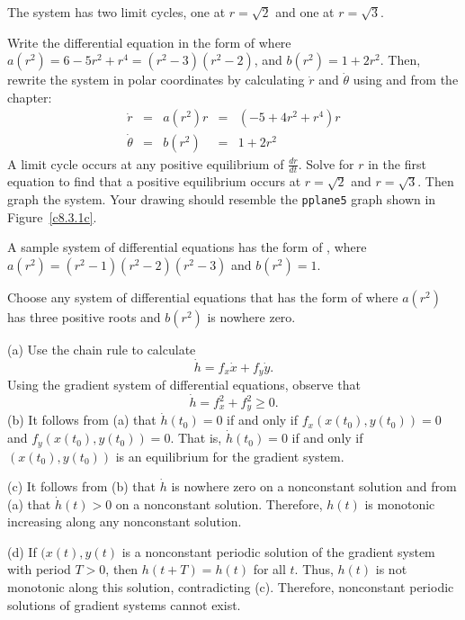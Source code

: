 \documentclass{ximera}
\begin{document}
\ans The system has two limit cycles, one at $r = \sqrt{2}$ and one
at $r = \sqrt{3}$. 

\soln Write the differential equation in the form of 
where $a(r^2) = 6 - 5r^2 + r^4=(r^2-3)(r^2-2)$, and 
$b(r^2) = 1+2r^2$.  Then,
rewrite the system in polar coordinates by calculating $\dot{r}$ and
$\dot{\theta}$ using  and  from the
chapter:
\[ 
\begin{array}{rcccl}
\dot{r} & = & a(r^2)r & = & (-5 + 4r^2 + r^4)r \\
\dot{\theta} & = & b(r^2) & = & 1+2r^2 \end{array}
\]
A limit cycle occurs at any positive equilibrium of $\frac{dr}{dt}$.
Solve for $r$ in the first equation to find that a positive equilibrium 
occurs at $r = \sqrt{2}$ and $r = \sqrt{3}$.  Then graph the system.  Your 
drawing should resemble the {\tt pplane5} graph shown in Figure~\ref{c8.3.1c}.

\begin{figure}[htb]
                       \centerline{%
                       }
\end{figure}

\newpage
{}
\soln A sample system of differential equations has the form of 
, where $a(r^2) = (r^2-1)(r^2-2)(r^2-3)$
and $b(r^2) = 1$.

\soln  Choose any system of differential equations that has the form of 
 where $a(r^2)$ has three positive roots
and $b(r^2)$ is nowhere zero.


\soln (a)  Use the chain rule to calculate
\[
\dot{h} = f_x\dot{x}+f_y\dot{y}.
\]
Using the gradient system of differential equations, observe that
\[
\dot{h} = f_x^2 + f_y^2\ge 0.
\]
(b) It follows from (a) that $\dot{h}(t_0)=0$ if and only if 
$f_x(x(t_0),y(t_0))=0$ and $f_y(x(t_0),y(t_0))=0$.  That is, 
$\dot{h}(t_0)=0$ if and only if $(x(t_0),y(t_0))$ is an equilibrium for the
gradient system.

\noindent (c) It follows from (b) that $\dot{h}$ is nowhere zero on a
nonconstant solution and from (a) that $\dot{h}(t)>0$ on a nonconstant
solution.  Therefore, $h(t)$ is monotonic increasing along any nonconstant
solution.

\noindent (d)  If $(x(t),y(t)$ is a nonconstant periodic solution of the
gradient system with period $T>0$, then $h(t+T)=h(t)$ for all $t$.  Thus,
$h(t)$ is not monotonic along this solution, contradicting (c).  Therefore,
nonconstant periodic solutions of gradient systems cannot exist.  
\end{document}
